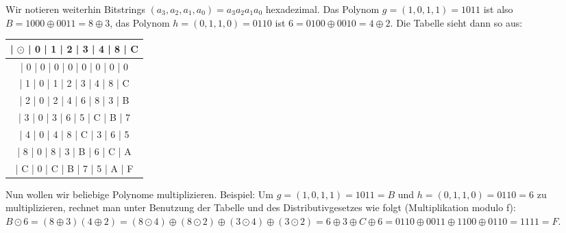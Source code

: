 \documentclass[a4paper]{article}
\begin{document}
\begin{multicols}{3}
    Wir notieren weiterhin Bitstrings $(a_3,a_2,a_1,a_0)=a_3a_2a_1a_0$ hexadezimal. Das Polynom $g=(1,0,1,1)=1011$ ist also $B=1000\oplus 0011=8\oplus 3$, das Polynom $h=(0,1,1,0)=0110$ ist $6=0100\oplus 0010=4\oplus 2$.
    Die Tabelle sieht dann so aus:
    \begin{tabular}{c}
        | $\odot$ | 0  | 1  | 2  | 3  | 4  | 8  | C \\\hline
        | 0    | 0  | 0  | 0  | 0  | 0  | 0  | 0    \\
        | 1    | 0  | 1  | 2  | 3  | 4  | 8  | C    \\
        | 2    | 0  | 2  | 4  | 6  | 8  | 3  | B    \\
        | 3    | 0  | 3  | 6  | 5  | C  | B  | 7    \\
        | 4    | 0  | 4  | 8  | C  | 3  | 6  | 5    \\
        | 8    | 0  | 8  | 3  | B  | 6  | C  | A    \\
        | C    | 0  | C  | B  | 7  | 5  | A  | F
    \end{tabular}

    Nun wollen wir beliebige Polynome multiplizieren. Beispiel: Um $g=(1,0,1,1)=1011=B$ und $h=(0,1,1,0)=0110=6$ zu multiplizieren, rechnet man unter Benutzung der Tabelle und des Distributivgesetzes wie folgt (Multiplikation modulo f):
    $B\odot 6=(8\oplus 3)(4\oplus 2)=(8\odot 4)\oplus(8\odot 2)\oplus(3\odot 4)\oplus(3\odot 2)=6\oplus 3\oplus C\oplus 6= 0110\oplus 0011 \oplus 1100 \oplus 0110 = 1111 = F$.


\end{multicols}
\end{document}
